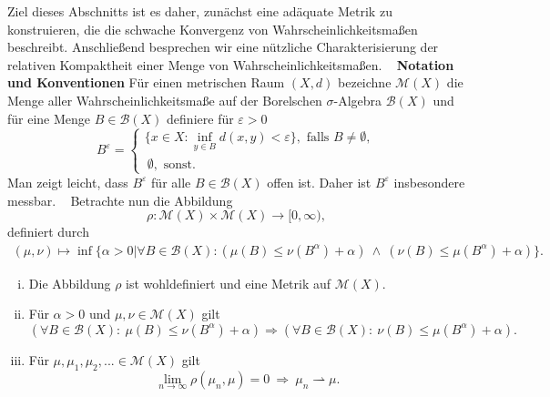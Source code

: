 Ziel dieses Abschnitts ist es daher, zunächst eine adäquate Metrik zu konstruieren, die die schwache Konvergenz von Wahrscheinlichkeitsmaßen beschreibt. 
Anschließend besprechen wir eine nützliche Charakterisierung der relativen Kompaktheit einer Menge von Wahrscheinlichkeitsmaßen. 
\newline \ \newline
\textbf{Notation und Konventionen} \newline 
Für einen metrischen Raum $(X,d)$ bezeichne $\mathcal{M}(X)$ die Menge aller Wahrscheinlichkeitsmaße auf der Borelschen $\sigma$-Algebra $\mathcal{B}(X)$ und für eine Menge $B \in \mathcal{B}(X)$ definiere für $\varepsilon > 0$
$$
    B^{\varepsilon} = \begin{cases}
         \{x \in X: \inf_{y \in B}d(x,y) < \varepsilon\}, \text{ falls } B \neq \emptyset, \\\ 
        \emptyset, \text{ sonst.}
    \end{cases}
$$
Man zeigt leicht, dass $B^{\varepsilon}$ für alle $B\in \mathcal{B}(X)$ offen ist. Daher ist $B^{\varepsilon}$ insbesondere messbar. 
\newline \ \newline 
Betrachte nun die Abbildung 
$$
    \rho: \mathcal{M}(X) \times \mathcal{M}(X) \to [0, \infty),
$$
definiert durch
\begin{align}
    (\mu, \nu) \mapsto \inf\{\alpha > 0 | \forall B \in \mathcal{B}(X): (\mu(B) \leq \nu(B^{\alpha}) + \alpha) \ \land \ (\nu(B) \leq \mu(B^{\alpha}) + \alpha) \}.
\end{align}
\begin{proposition}
    \begin{enumerate}[(i)]
        \item Die Abbildung $\rho$ ist wohldefiniert und eine Metrik auf $\mathcal{M}(X)$. 
        \item Für $\alpha > 0$ und $\mu, \nu \in \mathcal{M}(X)$ gilt
        $$
            (\forall B \in \mathcal{B}(X): \ \mu(B) \leq \nu(B^{\alpha}) + \alpha) \Rightarrow (\forall B \in \mathcal{B}(X): \ \nu(B) \leq \mu(B^{\alpha}) + \alpha).
        $$
        \item Für $\mu, \mu_1, \mu_2,... \in \mathcal{M}(X)$ gilt 
        $$
            \lim_{n \to \infty} \rho(\mu_n, \mu) = 0 \ \Rightarrow \ \mu_n \rightharpoonup \mu. 
        $$
    \end{enumerate}
\end{proposition}

